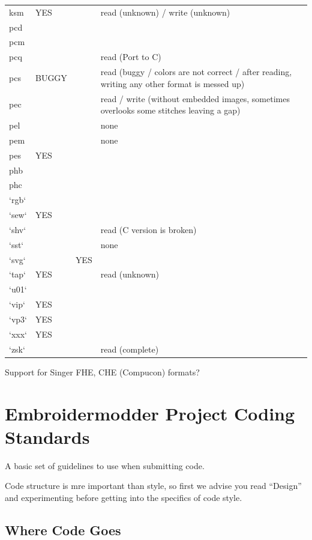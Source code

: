 \documentclass{report}
\begin{document}
\begin{longtable}{l l l p{8cm}}
\index{ksm}ksm & YES   &  & read (unknown) / write (unknown) \\
\index{pcd}pcd &  &  &  \\
\index{pcm}pcm &  &  & \\
\index{pcq}pcq &  &  & read (Port to C) \\
\index{pcs}pcs & BUGGY &  & read (buggy / colors are not correct / after reading, writing any other format is messed up) \\
\index{pec}pec &  &  & read / write (without embedded images, sometimes overlooks some stitches leaving a gap) \\
\index{pel}pel &  &  & none \\
\index{pem}pem &  &  & none \\
\index{pes}pes & YES   &  & \\
\index{phb}phb &  &  & \\
\index{phc}phc &  &  & \\
`rgb` &  &  & \\
`sew` & YES   &  & \\
`shv` &  &  & read (C version is broken) \\
`sst` &  &  & none \\
`svg` &  & YES   & \\
`tap` & YES   &  & read (unknown) \\
`u01` &  &  & \\
`vip` & YES   &  & \\
`vp3` & YES   &  & \\
`xxx` & YES   &  & \\
`zsk` &  &  & read (complete)
\end{longtable}

Support for Singer FHE, CHE (Compucon) formats?

\section{Embroidermodder Project Coding Standards}

A basic set of guidelines to use when submitting code.

Code structure is mre important than style, so first we advise you read ``Design'' and experimenting before getting into the specifics of code style.

\subsection{Where Code Goes}
\end{document}
